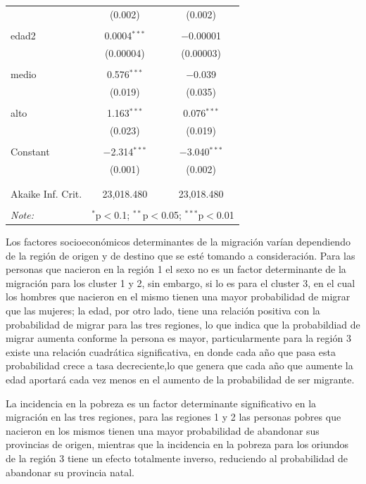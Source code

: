 \documentclass[12pt,a4paper]{article}
\begin{document}
\begin{table}[!htbp]
\begin{tabular}{@{\extracolsep{5pt}}lcc}
  & (0.002) & (0.002) \\ 
  & & \\ 
 edad2 & 0.0004$^{***}$ & $-$0.00001 \\ 
  & (0.00004) & (0.00003) \\ 
  & & \\ 
 medio & 0.576$^{***}$ & $-$0.039 \\ 
  & (0.019) & (0.035) \\ 
  & & \\ 
 alto & 1.163$^{***}$ & 0.076$^{***}$ \\ 
  & (0.023) & (0.019) \\ 
  & & \\ 
 Constant & $-$2.314$^{***}$ & $-$3.040$^{***}$ \\ 
  & (0.001) & (0.002) \\ 
  & & \\ 
\hline \\[-1.8ex] 
Akaike Inf. Crit. & 23,018.480 & 23,018.480 \\ 
\hline 
\hline \\[-1.8ex] 
\textit{Note:}  & \multicolumn{2}{r}{$^{*}$p$<$0.1; $^{**}$p$<$0.05; $^{***}$p$<$0.01} \\ 
\end{tabular} 
\end{table} 


Los factores socioeconómicos determinantes  de la migración varían dependiendo de la región de origen y de destino que se esté tomando a consideración.
Para las personas que nacieron en la región 1 el sexo no es un factor determinante de la migración para los cluster 1 y 2, sin embargo, si lo es para el cluster 3, en el cual los hombres que nacieron en el mismo tienen una mayor probabilidad de migrar que las mujeres; la edad, por otro lado, tiene una relación positiva con la probabilidad de migrar para las tres regiones, lo que indica que la probabildiad de migrar aumenta conforme la persona es mayor, particularmente para la región 3 existe una relación cuadrática significativa, en donde cada año que pasa esta probabilidad crece a tasa decreciente,lo que genera que cada año que aumente la edad aportará cada vez menos en el aumento de  la probabilidad de ser migrante.

La incidencia en la pobreza es un factor determinante significativo en la migración en las tres regiones, para las regiones 1 y 2 las personas pobres que nacieron en los mismos tienen una mayor probabilidad de abandonar sus provincias de origen, mientras que la incidencia en la pobreza para los oriundos de la región 3 tiene un efecto totalmente inverso, reduciendo al probabilidad de abandonar su provincia natal.
\end{document}
